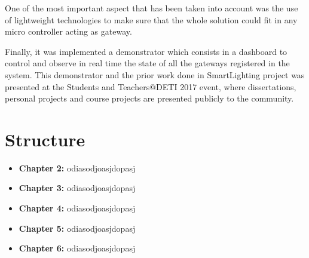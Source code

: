 One of the most important aspect that has been taken into account was the use of lightweight technologies to make sure that the whole solution could fit in any micro controller acting as gateway.

Finally, it was implemented a demonstrator which consists in a dashboard to control and observe in real time the state of all the gateways registered in the system. This demonstrator and the prior work done in SmartLighting project was presented at the Students and Teachers@DETI 2017 event, where dissertations, personal projects and course projects are presented publicly to the community.

\section{Structure}

\begin{itemize}

	\item{\textbf{Chapter 2:} odiasodjoasjdopasj}
	\item{\textbf{Chapter 3:} odiasodjoasjdopasj}
	\item{\textbf{Chapter 4:} odiasodjoasjdopasj}
	\item{\textbf{Chapter 5:} odiasodjoasjdopasj}
	\item{\textbf{Chapter 6:} odiasodjoasjdopasj}

\end{itemize}
